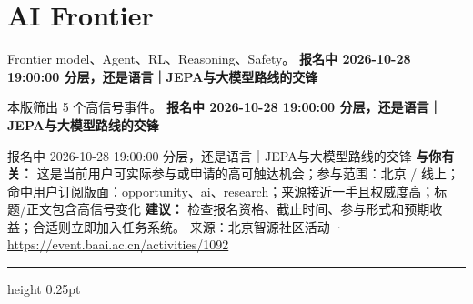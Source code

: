 \documentclass[10.5pt]{ctexart}
\begin{document}
\section*{AI Frontier}
{\color{ormuted} Frontier model、Agent、RL、Reasoning、Safety。}
\vspace{2mm}
{\LARGE\bfseries 报名中 2026-10-28 19:00:00 分层，还是语言｜JEPA与大模型路线的交锋}\par
\vspace{1mm}
{\color{ormuted} 本版筛出 5 个高信号事件。}
\vspace{3mm}
{\Large\bfseries 报名中 2026-10-28 19:00:00 分层，还是语言｜JEPA与大模型路线的交锋}\par
报名中 2026-10-28 19:00:00 分层，还是语言｜JEPA与大模型路线的交锋
\textbf{与你有关：} 这是当前用户可实际参与或申请的高可触达机会；参与范围：北京 / 线上；命中用户订阅版面：opportunity、ai、research；来源接近一手且权威度高；标题/正文包含高信号变化
\textbf{建议：} 检查报名资格、截止时间、参与形式和预期收益；合适则立即加入任务系统。
{\footnotesize\color{ormuted} 来源：北京智源社区活动 · \url{https://event.baai.ac.cn/activities/1092}}
\vspace{4mm}
\hrule height 0.25pt
\vspace{3mm}
\end{document}
